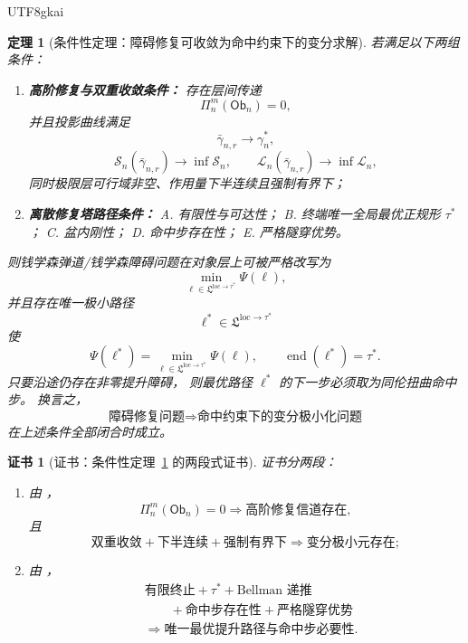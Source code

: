 \documentclass[12pt]{article}
\newtheorem{theorem}{定理}[section]
\newtheorem{Certificate}{证书}[section]
\begin{document}
\begin{CJK*}{UTF8}{gkai}
\begin{theorem}[条件性定理：障碍修复可收敛为命中约束下的变分求解]
\label{thm:tex1-ch5-conditional}
若满足以下两组条件：
\begin{enumerate}
  \item \textbf{高阶修复与双重收敛条件：}
  存在层间传递
  \[
    \Pi_n^m(\mathsf{Ob}_n)=0,
  \]
  并且投影曲线满足
  \[
    \bar{\gamma}_{n,r}\to \gamma_n^\ast,
  \]
  \[
    \mathcal S_n(\bar{\gamma}_{n,r})\to \inf \mathcal S_n,
    \qquad
    \mathcal L_n(\bar{\gamma}_{n,r})\to \inf \mathcal L_n,
  \]
  同时极限层可行域非空、作用量下半连续且强制有界下；
  \item \textbf{离散修复塔路径条件：}
  A. 有限性与可达性；
  B. 终端唯一全局最优正规形 \(\tau^\ast\)；
  C. 盆内刚性；
  D. 命中步存在性；
  E. 严格隧穿优势。
\end{enumerate}
则钱学森弹道/钱学森障碍问题在对象层上可被严格改写为
\[
  \min_{\ell\in \mathfrak L^{\mathrm{loc}\to\tau^\ast}} \Psi(\ell),
\]
并且存在唯一极小路径
\[
  \ell^\ast\in \mathfrak L^{\mathrm{loc}\to\tau^\ast}
\]
使
\[
  \Psi(\ell^\ast)
  =
  \min_{\ell\in \mathfrak L^{\mathrm{loc}\to\tau^\ast}}
  \Psi(\ell),
  \qquad
  \operatorname{end}(\ell^\ast)=\tau^\ast.
\]
只要沿途仍存在非零提升障碍，
则最优路径 \(\ell^\ast\) 的下一步必须取为同伦扭曲命中步。
换言之，
\[
  \text{障碍修复问题}
  \Longrightarrow
  \text{命中约束下的变分极小化问题}
\]
在上述条件全部闭合时成立。
\end{theorem}

\begin{Certificate}[证书：条件性定理~\ref{thm:tex1-ch5-conditional} 的两段式证书]
\label{cert:tex1-ch5-conditional}
证书分两段：
\begin{enumerate}
  \item 由 \cite{RepoTex36HomotopyTwistEquivalence,RepoTex41HomotopyRepairBundle}，
  \[
    \Pi_n^m(\mathsf{Ob}_n)=0
    \Rightarrow
    \text{高阶修复信道存在},
  \]
  且
  \[
    \text{双重收敛}
    +
    \text{下半连续}
    +
    \text{强制有界下}
    \Rightarrow
    \text{变分极小元存在};
  \]
  \item 由 \cite{RepoTex38JacobiBianchiRepair,RepoTex39OpenRepairFamily}，
  \[
    \begin{aligned}
      &\text{有限终止}
      +
      \tau^\ast
      +
      \text{Bellman 递推}\\
      &\qquad
      +
      \text{命中步存在性}
      +
      \text{严格隧穿优势}\\
      &\Rightarrow
      \text{唯一最优提升路径与命中步必要性}.
    \end{aligned}
  \]
\end{enumerate}
\end{Certificate}


\end{CJK*}
\end{document}
